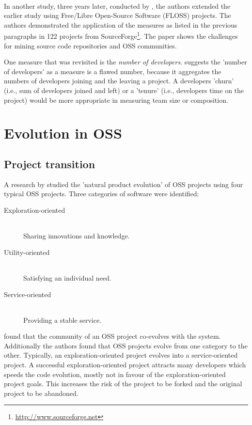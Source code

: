 \paragraph{}
In another study, three years later, conducted by \citet{crowston2006}, the
authors extended the earlier study using Free/Libre Open-Source Software (FLOSS)
projects. The authors demonstrated the application of the measures as listed in
the previous paragraphs in 122 projects from
SourceForge\footnote{\url{http://www.sourceforge.net}}.
The paper shows the challenges for mining source code repositories and OSS communities.

One measure that was revisited is the \textit{number of developers}.
\citeauthor{crowston2006} suggests the 'number of developers' as a measure is a
flawed number, because it aggregates the numbers of developers joining and the
leaving a project. A developers 'churn' (i.e., sum of developers joined and
left) or a 'tenure' (i.e., developers time on the project) would be more
appropriate in measuring team size or composition.





\section{Evolution in OSS}
\subsection{Project transition}
A research by \citet{nakakoji} studied the 'natural product evolution' of OSS
projects using four typical OSS projects. Three categories of software were
identified:

\begin{description}
	\item[Exploration-oriented] \hfill \\ Sharing innovations and knowledge.
	\item[Utility-oriented] \hfill \\ Satisfying an individual need.
	\item[Service-oriented] \hfill \\ Providing a stable service.
\end{description}

\noindent
\citeauthor{nakakoji} found that the community of an OSS project co-evolves
with the system. Additionally the authors found that OSS projects evolve from
one category to the other. Typically, an exploration-oriented project evolves
into a service-oriented project. A successful exploration-oriented project
attracts many developers which speeds the code evolution, mostly not in favour
of the exploration-oriented project goals. This increases the risk of the
project to be forked and the original project to be abandoned.

